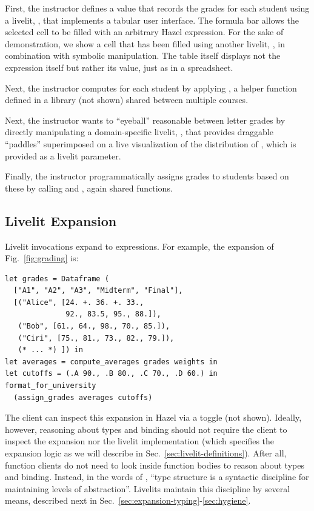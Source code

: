 First, the instructor defines a value 
that records the grades for each student using a livelit, ,
that implements a tabular user interface. The formula bar
allows the selected cell to be filled with an arbitrary Hazel expression.
For the sake of demonstration, we show a cell that has been filled using another livelit,
, in combination with symbolic manipulation.
The table itself displays not the expression itself but rather its value, just as in a spreadsheet.

Next, the instructor computes 
for each student by applying , a helper function
defined in a library  (not shown) shared between multiple courses.

Next, the instructor wants to ``eyeball'' reasonable  between letter grades
by directly manipulating a domain-specific livelit, , that provides draggable ``paddles''
superimposed on a live visualization of the distribution of , which is provided as a livelit parameter.

Finally,
the instructor programmatically assigns grades to students
based on these 
by calling 
and ,
again shared functions.

\subsection{Livelit Expansion}\label{sec:livelit-expansion}
Livelit invocations
expand to expressions.
For example, the expansion of Fig.~\ref{fig:grading} is:

\begin{lstlisting}[xleftmargin=0.2cm]
let grades = Dataframe (
  ["A1", "A2", "A3", "Midterm", "Final"],
  [("Alice", [24. +. 36. +. 33.,
              92., 83.5, 95., 88.]),
   ("Bob", [61., 64., 98., 70., 85.]),
   ("Ciri", [75., 81., 73., 82., 79.]),
   (* ... *) ]) in
let averages = compute_averages grades weights in
let cutoffs = (.A 90., .B 80., .C 70., .D 60.) in
format_for_university
  (assign_grades averages cutoffs)
\end{lstlisting}

The client can inspect this expansion in Hazel via a toggle (not shown).
Ideally, however, reasoning about types and binding
should not require the client to inspect the expansion
nor the livelit implementation (which specifies the expansion logic
as we will describe in Sec.~\ref{sec:livelit-definitions}).
After all, function clients do not need to look inside
function bodies to reason about types and binding.
Instead, in the words of \citet{DBLP:conf/ifip/Reynolds83},
``type structure is a syntactic discipline for maintaining levels of abstraction''.
Livelits maintain this discipline by
several means, described next in Sec.~\ref{sec:expansion-typing}-\ref{sec:hygiene}.

